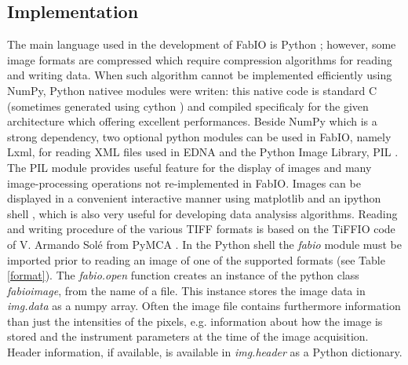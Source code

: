\documentclass{iucr}
\begin{document}
\subsection{Implementation}
The main language used in the development of FabIO is Python \cite{python};
however, some image formats are compressed which require
compression algorithms for reading and writing data. When such algorithm cannot
be implemented efficiently using NumPy, Python nativee modules were writen: this
native code is standard C (sometimes generated using cython
\cite{cython}) and compiled specificaly for the given architecture which
offering excellent performances.
Beside NumPy \cite{numpy} which is a strong dependency, two optional python
modules can be used in FabIO, namely Lxml, for reading XML files used in EDNA
\cite{edna} and the Python Image Library, PIL \cite{pil}.
The PIL module provides useful feature for the display of images and many
image-processing operations not re-implemented in FabIO.
% 
Images can be displayed in a convenient interactive manner using
matplotlib \cite{matplotlib} and an ipython shell \cite{ipython}, which is also 
very useful for developing data analysiss algorithms.
Reading and writing procedure of the various TIFF \cite{tiff} formats is based
on the TiFFIO code of V. Armando Sol\'e from PyMCA \cite{pymca}.
In the Python shell the {\em fabio} module must be imported prior to reading an
image of one of the supported formats (see Table \ref{format}).
The {\em fabio.open} function creates an instance of the python class {\em fabioimage},
from the name of a file. This instance stores the image data in {\em img.data}
as a numpy array. Often the image file contains furthermore information than
just the intensities of the pixels, e.g. information about how the image is
stored and the instrument parameters at the time of the image acquisition.
Header information, if available, is available in {\em img.header} as a Python
dictionary.
\end{document}

